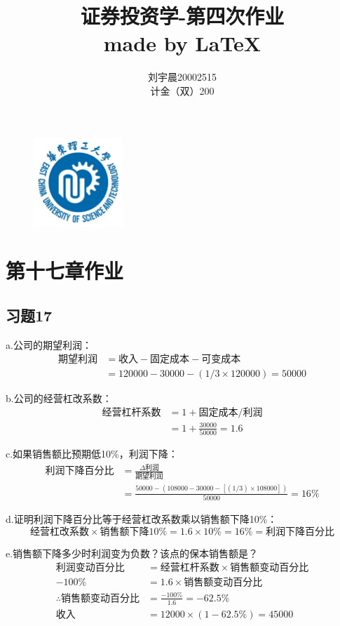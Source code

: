 \documentclass{article}
\title{\Huge 证券投资学-第四次作业    \\\large made by  \LaTeX}
\author{刘宇晨\hspace*{25pt}20002515\\计金（双）200}
\begin{document}
 
\begin{figure}[H]
    \begin{center}
        \includegraphics[width=0.3\textwidth]{logo.jpeg}
        \maketitle
    \end{center}
\end{figure}
\thispagestyle{empty}
\clearpage
{}
\section*{\center 第十七章作业}
\subsection*{习题17}
a.公司的期望利润：
\nonumber
\begin{align}
    \text{期望利润}&=\text{收入}-\text{固定成本}-\text{可变成本}\\
    &=120000-30000-(1/3 \times 120000)=50000
\end{align}

b.公司的经营杠改系数：
\begin{align}
    \text{经营杠杆系数}&=1+\text{固定成本}/\text{利润}\\
    &=1+\frac{30000}{50000}=1.6
\end{align}

c.如果销售额比预期低10\%，利润下降：
\begin{align}
    \text{利润下降百分比}&=\frac{\varDelta \text{利润}}{\text{期望利润}}\\
   & =\frac{50000-(108000-30000-[(1/3)\times 108000])}{50000}=16\%
\end{align}

d.证明利润下降百分比等于经营杠改系数乘以销售额下降10\%：
\[\text{经营杠改系数}\times\text{销售额下降10\%}=1.6\times 10\% = 16\%=\text{利润下降百分比}\]

e.销售额下降多少时利润变为负数？该点的保本销售额是？
\begin{align}
    \text{利润变动百分比}&=\text{经营杠杆系数}\times \text{销售额变动百分比}\\
    -100\%&=1.6\times \text{销售额变动百分比}\\
    \therefore \text{销售额变动百分比}&=\frac{-100\%}{1.6}=-62.5\%\\
    \text{收入}&=12000\times (1-62.5\%)=45000
\end{align}
\end{document}
